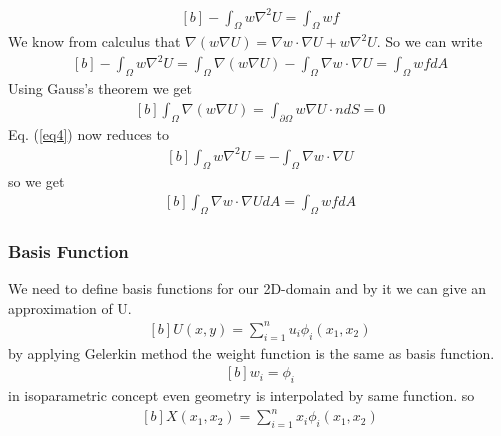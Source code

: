 \documentclass[]{article}
\begin{document}
\begin{equation}\label{eq3}
	\begin{aligned}[b]
		-\int_\Omega w\nabla^2 U = \int_\Omega wf
	\end{aligned}
\end{equation}
We know from calculus that $\nabla(w\nabla U) = \nabla w \cdot \nabla U + w\nabla ^2 U$. So we can write
\begin{equation}\label{eq4}
	\begin{aligned}[b]
		-\int_\Omega w\nabla^2U = \int_{\Omega} \nabla(w\nabla U) - \int_{\Omega} \nabla w \cdot \nabla U = \int_\Omega wf dA
	\end{aligned}
\end{equation}
Using Gauss’s theorem we get
\begin{equation}\label{eq5}
	\begin{aligned}[b]
		\int_\Omega \nabla(w\nabla U) = \int_{\partial\Omega} w \nabla U \cdot n dS = 0
	\end{aligned}
\end{equation}
Eq. (\ref{eq4}) now reduces to
\begin{equation}\label{eq6}
	\begin{aligned}[b]
		\int_\Omega w\nabla^2U = - \int_{\Omega} \nabla w \cdot \nabla U
	\end{aligned}
\end{equation}
so we get 
\begin{equation}\label{eq7}
	\begin{aligned}[b]
		\int_{\Omega} \nabla w \cdot \nabla U dA = \int_\Omega wf dA
	\end{aligned}
\end{equation}
\subsubsection{Basis Function} \label{sec: Basis Func}
We need to define basis functions for our 2D-domain and by it we can give an approximation of U.
\begin{equation}\label{eq8}
	\begin{aligned}[b]
		U(x,y) =\sum_{i=1}^{n} u_{i}\phi_{i}(x_{1},x_{2})
	\end{aligned}
\end{equation}
by applying Gelerkin method the weight function is the same as basis function.
\begin{equation}\label{eq9}
	\begin{aligned}[b]
		w_{i} =\phi_{i}
	\end{aligned}
\end{equation}
in isoparametric concept even geometry is interpolated by same function. so
\begin{equation}\label{eq10}
	\begin{aligned}[b]
		X(x_{1},x_{2}) =\sum_{i=1}^{n} x_{i}\phi_{i}(x_{1},x_{2})
	\end{aligned}
\end{equation}
\end{document}
